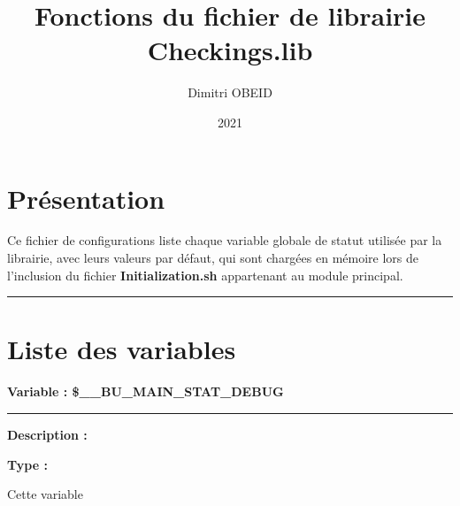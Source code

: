 \documentclass[a4paper,10pt]{article}
\title{\color{sec1}Fonctions du fichier de librairie \color{path}Checkings.lib}\color{text}
\author{Dimitri OBEID}
\date{2021}
\begin{document}
\maketitle
\newpage

\hypertarget{contents}{}
\tableofcontents
\newpage

\color{sec1}
\section{Présentation}\color{text}

\begin{justify}
    Ce fichier de configurations liste chaque variable globale de statut utilisée par la librairie, avec leurs valeurs par défaut, qui sont chargées en mémoire lors de l'inclusion du fichier \textbf{\color{path}Initialization.sh} appartenant au module principal.
\end{justify}





\color{sec1}\par\noindent\rule{\textwidth}{0.4pt}\color{text}

\color{sec1}
\section{Liste des variables}\color{text}

\textbf{Variable : \color{vars}\$\_\_BU\_MAIN\_STAT\_DEBUG}\\[1\baselineskip]

\par\noindent\rule{\textwidth}{0.4pt}

\begin{justify}
    \textbf{Description :}
\end{justify}

\setlength{\parskip}{1em}

\begin{justify}
    \textbf{Type : }
\end{justify}

\setlength{\parskip}{1em}

\begin{justify}
    Cette variable
\end{justify}
\end{document}
